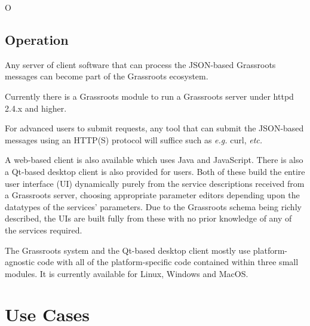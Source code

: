\documentclass[12pt,a4paper]{extarticle}
\begin{document}
O
\subsection*{Operation}

Any server of client software that can process the JSON-based Grassroots messages can become part of the Grassroots ecosystem.

Currently there is a Grassroots module to run a Grassroots server under httpd 2.4.x and higher. 

For advanced users to submit requests, any tool that can submit the JSON-based messages using an HTTP(S) protocol will suffice such as \textit{e.g.} curl\cite{curl}, \textit{etc.} 




A web-based client is also available which uses Java\cite{Java} and JavaScript. 
There is also a Qt-based\cite{qt} desktop client is also provided for users. 
Both of these build the entire user interface (UI) dynamically purely from the service descriptions received from a Grassroots server, choosing appropriate parameter editors depending upon the datatypes of the services' parameters.
Due to the Grassroots schema being richly described, the UIs are built fully from these with no prior knowledge of any of the services required. 

The Grassroots system and the Qt-based desktop client mostly use platform-agnostic code with all of the platform-specific code contained within three small modules. It is currently  available for Linux, Windows and MacOS.




\section{Use Cases} 
\label{sec:usage} %
\end{document}
